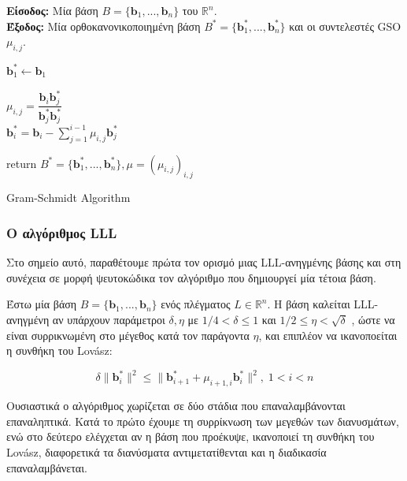 \begin{algorithm}[H] \label{GSO}
\SetAlgoLined

{\bf Είσοδος:} Μία βάση $ B = \{\bm b_1, ..., \bm b_n \} $ του $ \mathbb{R}^n $.  \\
{\bf Έξοδος:} Μία ορθοκανονικοποιημένη βάση $ B^* = \{\bm b_1^*, ..., \bm b_n^* \} $ και οι συντελεστές GSO $ μ_{i,j} $.

$\bm b_1^* \gets \bm b_1$

   {
         {
              $ μ_{i,j} = \dfrac{\bm b_i \bm b_j^*}{\bm b_j^* \bm b_j^*} $ \\
              $ \bm b_i^* = \bm b_i - \sum_{j=1}^{i-1} μ_{i,j} \bm b_j^* $
    
        }

  }

return $ B^* = \{\bm b_1^*, ..., \bm b_n^* \}, μ = (μ_{i,j})_{i,j} $

\caption{Gram-Schmidt Algorithm}
\end{algorithm}

\subsubsection{Ο αλγόριθμος \lt LLL}

Στο σημείο αυτό, παραθέτουμε πρώτα τον ορισμό μιας LLL-ανηγμένης βάσης και στη συνέχεια σε μορφή ψευτοκώδικα τον αλγόριθμο που δημιουργεί μία τέτοια βάση.

\begin{definition}

Έστω μία βάση $ B = \{\bm b_1, ..., \bm b_n \} $ ενός πλέγματος $ L \in \mathbb{R}^n $. Η βάση καλείται LLL-ανηγμένη αν υπάρχουν παράμετροι $ δ, η $ με $ 1/4 < δ \leq 1 $  και $ 1/2 \leq η < \sqrt{δ} $ , ώστε να είναι συρρικνωμένη στο μέγεθος κατά τον παράγοντα $ η $, και επιπλέον να ικανοποείται η συνθήκη του Lovász: 

$$ δ\| \bm b_{i}^*  \|^2 \leq \| \bm b_{i+1}^* + μ_{i+1, i} \bm b_i^*\|^2, \;   1 < i < n $$

\end{definition}


Ουσιαστικά ο αλγόριθμος χωρίζεται σε δύο στάδια που επαναλαμβάνονται επαναληπτικά. Κατά το πρώτο έχουμε τη συρρίκνωση των μεγεθών των διανυσμάτων, ενώ στο δεύτερο ελέγχεται αν η βάση που προέκυψε, ικανοποιεί τη συνθήκη του Lovász, διαφορετικά τα διανύσματα αντιμετατίθενται και η διαδικασία επαναλαμβάνεται.  


